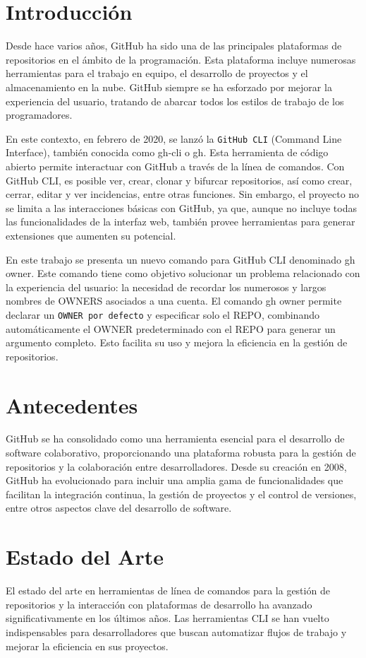 \section{Introducción}
Desde hace varios años, GitHub ha sido una de las principales plataformas de repositorios en el ámbito de la programación. Esta plataforma incluye numerosas herramientas para el trabajo en equipo, el desarrollo de proyectos y el almacenamiento en la nube. GitHub siempre se ha esforzado por mejorar la experiencia del usuario, tratando de abarcar todos los estilos de trabajo de los programadores.

En este contexto, en febrero de 2020, se lanzó la \verb|GitHub CLI| \cite{github-cli} (Command Line Interface), también conocida como gh-cli o gh. Esta herramienta de código abierto permite interactuar con GitHub a través de la línea de comandos. Con GitHub CLI, es posible ver, crear, clonar y bifurcar repositorios, así como crear, cerrar, editar y ver incidencias, entre otras funciones. Sin embargo, el proyecto no se limita a las interacciones básicas con GitHub, ya que, aunque no incluye todas las funcionalidades de la interfaz web, también provee herramientas para generar extensiones que aumenten su potencial.

En este trabajo se presenta un nuevo comando para GitHub CLI denominado gh owner. Este comando tiene como objetivo solucionar un problema relacionado con la experiencia del usuario: la necesidad de recordar los numerosos y largos nombres de OWNERS asociados a una cuenta. El comando gh owner permite declarar un \verb|OWNER por defecto| \cite{default-owners} y especificar solo el REPO, combinando automáticamente el OWNER predeterminado con el REPO para generar un argumento completo. Esto facilita su uso y mejora la eficiencia en la gestión de repositorios.

\section{Antecedentes}
GitHub se ha consolidado como una herramienta esencial para el desarrollo de software colaborativo, proporcionando una plataforma robusta para la gestión de repositorios y la colaboración entre desarrolladores. Desde su creación en 2008, GitHub ha evolucionado para incluir una amplia gama de funcionalidades que facilitan la integración continua, la gestión de proyectos y el control de versiones, entre otros aspectos clave del desarrollo de software.

\section{Estado del Arte}
El estado del arte en herramientas de línea de comandos para la gestión de repositorios y la interacción con plataformas de desarrollo ha avanzado significativamente en los últimos años. Las herramientas CLI se han vuelto indispensables para desarrolladores que buscan automatizar flujos de trabajo y mejorar la eficiencia en sus proyectos.

